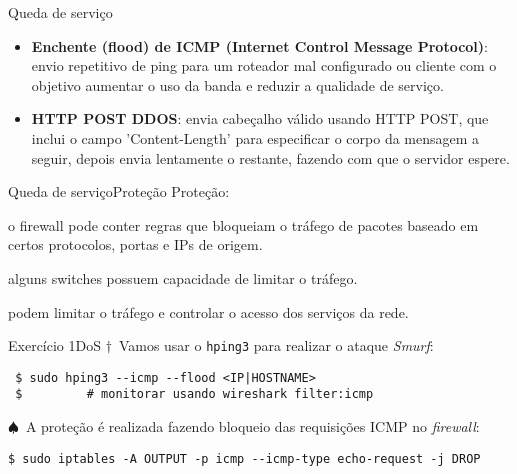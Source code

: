   \begin{frame}{Queda de serviço}
    \begin{itemize}[<+->]
    \item {\bf Enchente (flood) de ICMP (Internet Control Message
        Protocol)}: envio repetitivo de ping para um roteador mal
      configurado ou cliente com o objetivo aumentar o uso da banda e
      reduzir a qualidade de serviço.
    \item {\bf HTTP POST DDOS}: envia cabeçalho válido usando HTTP
      POST, que inclui o campo 'Content-Length' para especificar o
      corpo da mensagem a seguir, depois envia lentamente o restante,
      fazendo com que o servidor espere.
    \end{itemize}    
  \end{frame}

  \begin{frame}{Queda de serviço}{Proteção}
    Proteção:\\
    \begin{description}[<+->]
    \item[Firewall:] o firewall pode conter regras que bloqueiam o tráfego
      de pacotes baseado em certos protocolos, portas e IPs de origem.
    \item[Switch:] alguns switches possuem capacidade de limitar o tráfego.
    \item[Roteador:] podem limitar o tráfego e controlar o acesso dos
      serviços da rede.
    \end{description}
  \end{frame}

\begin{frame}[fragile]{Exercício 1}{DoS}
  {\color{red}$\dagger$~Vamos usar o {\tt hping3} para realizar o ataque {\em Smurf}:}
 \begin{verbatim}
 $ sudo hping3 --icmp --flood <IP|HOSTNAME> 
 $         # monitorar usando wireshark filter:icmp
 \end{verbatim}

  \bigskip\pause

{\color{blue}$\spadesuit$~A proteção é realizada fazendo bloqueio das requisições ICMP no {\em firewall}:}
\begin{verbatim}
$ sudo iptables -A OUTPUT -p icmp --icmp-type echo-request -j DROP
\end{verbatim}
  \end{frame}

